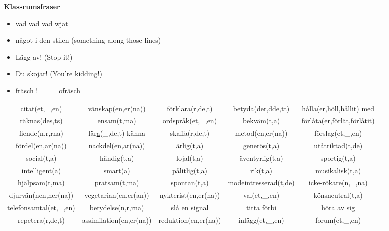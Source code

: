 
\begin{flushleft}
    \textbf{Klassrumsfraser}
    \begin{itemize}
        \item vad vad vad wjat
        \item något i den stilen (something along those lines)
        \item Lägg av! (Stop it!)
        \item Du skojar! (You're kidding!)
        \item fräsch $!==$ ofräsch
    \end{itemize}
\end{flushleft}

\begin{center}
    \begin{adjustwidth}{-2.5cm}{}
        \begin{tabular}{|c c c c c c|}
            \hline
            citat(et,\_,en) & vänskap(en,er(na)) & förklara(r,de,t) & bety\underline{da}(der,dde,tt) & hålla(er,höll,hållit) med &  \\
            räkna\underline{s}(des,ts) & ensam(t,ma) & ordspråk(et,\_,en) & bekväm(t,a) & förlåt\underline{a}(er,förlät,förlåtit) &  \\
            fiende(n,r,rna) & lär\underline{a}(\_,de,t) känna & skaffa(r,de,t) & metod(en,er(na)) & förslag(et,\_,en) &  \\
            fördel(en,ar(na)) & nackdel(en,ar(na)) & ärlig(t,a) & generös(t,a) & utåtrikta\underline{d}(t,de) &  \\
            social(t,a) & händig(t,a) & lojal(t,a) & äventyrlig(t,a) & sportig(t,a) &  \\
            intelligent(a) & smart(a) & pålitlig(t,a) & rik(t,a) & musikalisk(t,a) &  \\
            hjälpsam(t,ma) & pratsam(t,ma) & spontan(t,a) & modeintressera\underline{d}(t,de) & icke-rökare(n,\_,na) &  \\
            djurvän(nen,ner(na)) & vegetarian(en,er(an)) & nykterist(en,er(na)) & val(et,\_,en) & könsneutral(t,a) &  \\
            telefonsamtal(et,\_,en) & betydelse(n,r,rna) & slå en signal & titta förbi & höra av sig &  \\
            repetera(r,de,t) & assimilation(en,er(na)) & reduktion(en,er(na)) & inlägg(et,\_,en) & forum(et,\_,en) &  \\

\end{tabular}
\end{adjustwidth}
\end{center}
